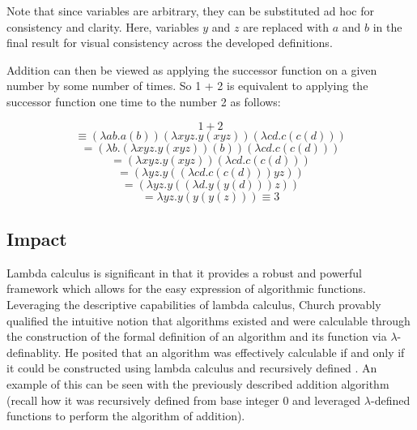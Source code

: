 \documentclass[letterpaper, 10 pt, conference]{ieeeconf}  %
\begin{document}
Note that since variables are arbitrary, they can be substituted ad hoc for consistency and clarity. Here, variables $y$ and $z$ are replaced with $a$ and $b$ in the final result for visual consistency across the developed definitions.

Addition can then be viewed as applying the successor function on a given number by some number of times. So 1 + 2 is equivalent to applying the successor function one time to the number 2 as follows:

\begin{equation}
    1 + 2
\end{equation}
\begin{equation}
    \equiv (\lambda ab . a(b)) (\lambda xyz . y(xyz)) (\lambda cd . c(c(d)))
\end{equation}
\begin{equation}
    = (\lambda b . (\lambda xyz . y(xyz)) (b)) (\lambda cd . c(c(d)))
\end{equation}
\begin{equation}
    = (\lambda xyz . y(xyz)) (\lambda cd . c(c(d)))
\end{equation}
\begin{equation}
    = (\lambda yz . y((\lambda cd . c(c(d))) yz))
\end{equation}
\begin{equation}
    = (\lambda yz . y((\lambda d . y(y(d))) z))
\end{equation}
\begin{equation}
    = \lambda yz . y(y(y(z))) \equiv 3
\end{equation}

\subsection{Impact}

Lambda calculus is significant in that it provides a robust and powerful framework which allows for the easy expression of algorithmic functions. Leveraging the descriptive capabilities of lambda calculus, Church provably qualified the intuitive notion that algorithms existed and were calculable through the construction of the formal definition of an algorithm and its function via $\lambda$-definablity. He posited that an algorithm was effectively calculable if and only if it could be constructed using lambda calculus and recursively defined \cite{Church4}. An example of this can be seen with the previously described addition algorithm (recall how it was recursively defined from base integer 0 and leveraged $\lambda$-defined functions to perform the algorithm of addition).
\end{document}
